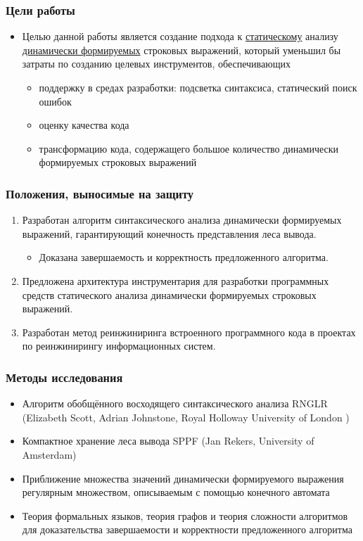 \documentclass{beamer}
\begin{document}
\begin{frame}
    \transwipe[direction=90]
    \frametitle{Цели работы}
    \begin{itemize}
        \item Целью данной работы является создание подхода к \underline{статическому} анализу \underline{динамически формируемых} строковых выражений, 
        который уменьшил бы затраты по созданию целевых инструментов, обеспечивающих 
        \begin{itemize}
            \item поддержку в средах разработки: подсветка синтаксиса, статический поиск ошибок
            \item оценку качества кода
            \item трансформацию кода, содержащего большое количество динамически формируемых строковых 
        выражений
        \end{itemize}
    \end{itemize}
\end{frame}

\begin{frame}
    \transwipe[direction=90]
    \frametitle{Положения, выносимые на защиту}
    \begin{enumerate}
        \item Разработан алгоритм синтаксического анализа динамически формируемых выражений, гарантирующий конечность представления леса вывода. 
        \begin{itemize}
            \item Доказана завершаемость и корректность предложенного алгоритма.
        \end{itemize}
        \item Предложена архитектура инструментария для разработки программных средств статического анализа динамически формируемых строковых выражений.
        \item Разработан метод реинжиниринга встроенного программного кода в проектах по реинжинирингу информационных систем. 
    \end{enumerate}
\end{frame}


\begin{frame}
    \transwipe[direction=90]
    \frametitle{Методы исследования}
        \begin{itemize}
            \item Алгоритм обобщённого восходящего синтаксического анализа RNGLR (Elizabeth Scott, Adrian Johnstone, Royal Holloway University of London )
            \item Компактное хранение леса вывода SPPF (Jan Rekers, University of Amsterdam)
            \item Приближение множества значений динамически формируемого выражения регулярным множеством, описываемым с помощью конечного автомата
            \item Теория формальных языков, теория графов и теория сложности алгоритмов для доказательства завершаемости и корректности предложенного алгоритма            
        \end{itemize}
\end{frame}
\end{document}
